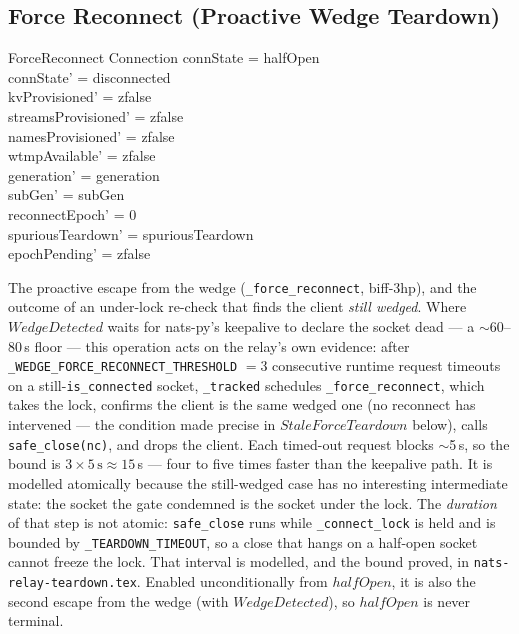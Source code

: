 \documentclass[a4paper,10pt,fleqn]{article}
\begin{document}
\subsection{Force Reconnect (Proactive Wedge Teardown)}

\begin{schema}{ForceReconnect}
  \Delta Connection
  \where
  connState = halfOpen \\
  connState' = disconnected \\
  kvProvisioned' = zfalse \\
  streamsProvisioned' = zfalse \\
  namesProvisioned' = zfalse \\
  wtmpAvailable' = zfalse \\
  generation' = generation \\
  subGen' = subGen \\
  reconnectEpoch' = 0 \\
  spuriousTeardown' = spuriousTeardown \\
  epochPending' = zfalse
\end{schema}

The proactive escape from the wedge (\texttt{\_force\_reconnect},
biff-3hp), and the outcome of an under-lock re-check that finds the
client \emph{still wedged}.  Where $WedgeDetected$ waits for nats-py's
keepalive to declare the socket dead --- a $\sim$60--80\,s floor ---
this operation acts on the relay's own evidence: after
\texttt{\_WEDGE\_FORCE\_RECONNECT\_THRESHOLD} $= 3$ consecutive runtime
request timeouts on a still-\texttt{is\_connected} socket,
\texttt{\_tracked} schedules \texttt{\_force\_reconnect}, which takes the
lock, confirms the client is the same wedged one (no reconnect has
intervened --- the condition made precise in $StaleForceTeardown$
below), calls \texttt{safe\_close(nc)}, and drops the client.  Each
timed-out request blocks $\sim$5\,s, so the bound is $3 \times
5\,\mathrm{s} \approx 15\,$s --- four to five times faster than the
keepalive path.  It is modelled atomically because the still-wedged case
has no interesting intermediate state: the socket the gate condemned is
the socket under the lock.  The \emph{duration} of that step is not
atomic: \texttt{safe\_close} runs while \texttt{\_connect\_lock} is held and
is bounded by \texttt{\_TEARDOWN\_TIMEOUT}, so a close that hangs on a
half-open socket cannot freeze the lock.  That interval is modelled, and
the bound proved, in \texttt{nats-relay-teardown.tex}.  Enabled
unconditionally from $halfOpen$, it
is also the second escape from the wedge (with $WedgeDetected$), so
$halfOpen$ is never terminal.
\end{document}
